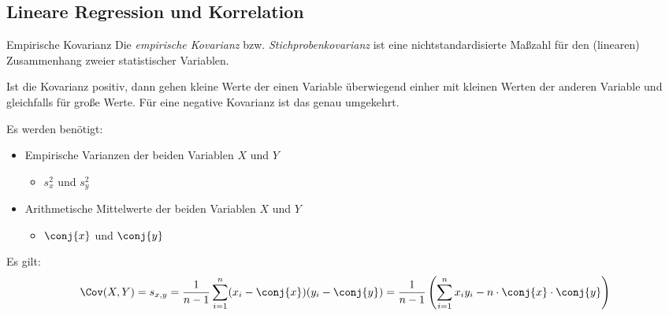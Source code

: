 \subsection{Lineare Regression und Korrelation}

\begin{defi}{Empirische Kovarianz}
    Die \emph{empirische Kovarianz} bzw. \emph{Stichprobenkovarianz} ist  eine nichtstandardisierte Maßzahl für den (linearen) Zusammenhang zweier statistischer Variablen.

    Ist die Kovarianz positiv, dann gehen kleine Werte der einen Variable überwiegend einher mit kleinen Werten der anderen Variable und gleichfalls für große Werte.
    Für eine negative Kovarianz ist das genau umgekehrt.

    Es werden benötigt:
    \begin{itemize}
        \item Empirische Varianzen der beiden Variablen $X$ und $Y$
              \begin{itemize}
                  \item $s_x^2$ und $s_y^2$
              \end{itemize}
        \item Arithmetische Mittelwerte der beiden Variablen $X$ und $Y$
              \begin{itemize}
                  \item $\conj{x}$ und $\conj{y}$
              \end{itemize}
    \end{itemize}

    Es gilt:
    \[
        \Cov(X, Y) = s_{x, y} = \frac{1}{n-1} \sum_{i=1}^{n} (x_i - \conj{x}) (y_i - \conj{y}) = \frac{1}{n-1} \left( \sum_{i=1}^{n} x_i y_i - n\cdot \conj{x} \cdot \conj{y} \right)
    \]
\end{defi}

